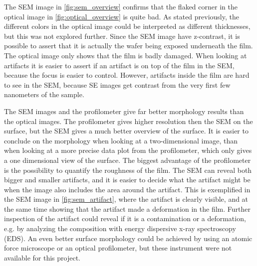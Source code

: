 The SEM image in \autoref{fig:sem_overview} confirms that the flaked corner in the optical image in \autoref{fig:optical_overview} is quite bad.
As stated previously, the different colors in the optical image could be interpreted as different thicknesses, but this was not explored further.
Since the SEM image have z-contrast, it is possible to assert that it is actually the wafer being exposed underneath the film.
The optical image only shows that the film is badly damaged.
When looking at artifacts it is easier to assert if an artifact is on top of the film in the SEM, because the focus is easier to control.
However, artifacts inside the film are hard to see in the SEM, because SE images get contrast from the very first few nanometers of the sample.

The SEM images and the profilometer give far better morphology results than the optical images.
The profilometer gives higher resolution then the SEM on the surface, but the SEM gives a much better overview of the surface.
It is easier to conclude on the morphology when looking at a two-dimensional image, than when looking at a more precise data plot from the profilometer, which only gives a one dimensional view of the surface.
The biggest advantage of the profilometer is the possibility to quantify the roughness of the film.
The SEM can reveal both bigger and smaller artifacts, and it is easier to decide what the artifact might be when the image also includes the area around the artifact.
This is exemplified in the SEM image in \autoref{fig:sem_artifact}, where the artifact is clearly visible, and at the same time showing that the artifact made a deformation in the film.
Further inspection of the artifact could reveal if it is a contamination or a deformation, e.g. by analyzing the composition with energy dispersive x-ray spectroscopy (EDS).
An even better surface morphology could be achieved by using an atomic force microscope or an optical profilometer, but these instrument were not available for this project.